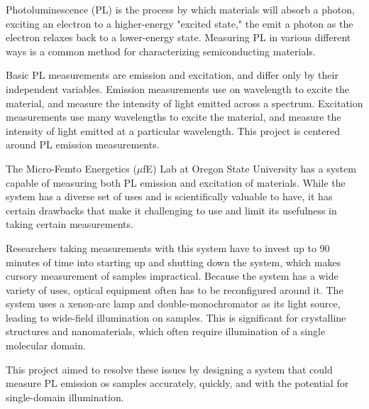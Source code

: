 
Photoluminescence (PL) is the process by which materials will absorb a photon, exciting an electron to a higher-energy "excited state," the emit a photon as the electron relaxes back to a lower-energy state. Measuring PL in various different ways is a common method for characterizing semiconducting materials.

Basic PL measurements are emission and excitation, and differ only by their independent variables. Emission measurements use on wavelength to excite the material, and measure the intensity of light emitted across a spectrum. Excitation measurements use many wavelengths to excite the material, and measure the intensity of light emitted at a particular wavelength. This project is centered around PL emission measurements.

The Micro-Femto Energetics ($\mu$fE) Lab at Oregon State University has a system capable of measuring both PL emission and excitation of materials. While the system has a diverse set of uses and is scientifically valuable to have, it has certain drawbacks that make it challenging to use and limit its usefulness in taking certain measurements.

Researchers taking measurements with this system have to invest up to 90 minutes of time into starting up and shutting down the system, which makes cursory measurement of samples impractical. Because the system has a wide variety of uses, optical equipment often has to be reconfigured around it. The system uses a xenon-arc lamp and double-monochromator as its light source, leading to wide-field illumination on samples. This is significant for crystalline structures and nanomaterials, which often require illumination of a single molecular domain.

This project aimed to resolve these issues by designing a system that could measure PL emission os samples accurately, quickly, and with the potential for single-domain illumination.

